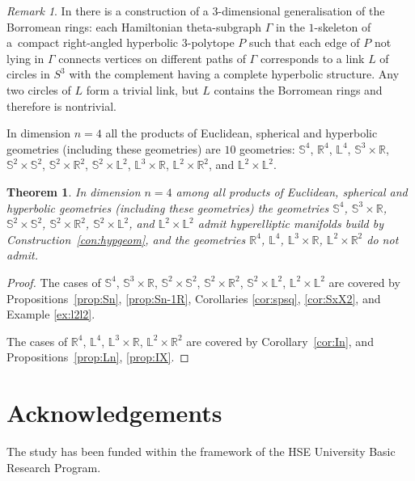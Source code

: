 \documentclass[12pt]{amsart}
\newtheorem{theorem}[formula]{Theorem}
\theoremstyle{definition}
\theoremstyle{remark}
\newtheorem{remark}[formula]{Remark}
\begin{document}
\begin{remark} 
In \cite{E25} there is a construction of a $3$-dimensional generalisation
of the Borromean rings: each Hamiltonian theta-subgraph $\Gamma$ in the $1$-skeleton of 
a~compact right-angled hyperbolic $3$-polytope $P$ 
such that each edge of $P$ not lying in $\Gamma$ connects vertices on different paths of $\Gamma$ corresponds
to a link $L$ of circles in $S^3$ with the complement having a complete hyperbolic structure. Any two 
circles of $L$ form a trivial link, but $L$ contains the Borromean rings and therefore is nontrivial.
\end{remark}

In dimension $n=4$ all the products of Euclidean, spherical and hyperbolic geometries (including
these geometries) are $10$ geometries: 
$\mathbb S^4$, $\mathbb R^4$, $\mathbb L^4$, $\mathbb S^3\times \mathbb R$,
$\mathbb S^2\times\mathbb S^2$, $\mathbb S^2\times\mathbb R^2$, $\mathbb S^2\times \mathbb L^2$,
$\mathbb L^3\times \mathbb R$, $\mathbb L^2\times \mathbb R^2$, and $\mathbb L^2\times\mathbb L^2$.
\begin{theorem}\label{th:geomn=4}
In dimension $n=4$ among all products of Euclidean, spherical and hyperbolic geometries (including
these geometries) the geometries $\mathbb S^4$, $\mathbb S^3\times \mathbb R$, 
$\mathbb S^2\times \mathbb S^2$, $\mathbb S^2\times \mathbb R^2$, $\mathbb S^2\times \mathbb L^2$,
and $\mathbb L^2\times \mathbb L^2$ admit hyperelliptic manifolds build by Construction~\ref{con:hypgeom},
and the geometries $\mathbb R^4$, $\mathbb L^4$, $\mathbb L^3\times \mathbb R$, $\mathbb L^2\times\mathbb R^2$
do not admit.
\end{theorem}
\begin{proof}
The cases of $\mathbb S^4$, $\mathbb S^3\times \mathbb R$,
$\mathbb S^2\times \mathbb S^2$, $\mathbb S^2\times \mathbb R^2$, $\mathbb S^2\times \mathbb L^2$, $\mathbb L^2\times \mathbb L^2$
are covered by Propositions~\ref{prop:Sn}, \ref{prop:Sn-1R}, Corollaries \ref{cor:spsq}, \ref{cor:SxX2}, and Example \ref{ex:l2l2}.

The cases of $\mathbb R^4$, $\mathbb L^4$, $\mathbb L^3\times \mathbb R$, $\mathbb L^2\times\mathbb R^2$ are covered
by Corollary~\ref{cor:In}, and Propositions~\ref{prop:Ln}, \ref{prop:IX}.
\end{proof}

\section{Acknowledgements}
The study has been funded within the framework of the HSE University Basic Research Program.
\end{document}
